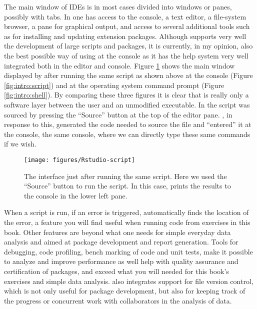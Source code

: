 \documentclass[krantz2]{krantz}\usepackage{knitr}
\begin{document}
The main window of IDEs is in most cases divided into windows or panes, possibly with tabs. In \RStudio one has access to the \Rpgrm console, a text editor, a file-system browser, a pane for graphical output, and access to several additional tools such as for installing and updating extension packages. Although \RStudio supports very well the development of large scripts and packages, it is currently, in my opinion, also the best possible way of using \Rpgrm at the console as it has the \Rpgrm help system very well integrated both in the editor and \Rlang console. Figure \ref{fig:intro:rstudio} shows the main window displayed by \RStudio after running the same script as shown above at the \Rpgrm console (Figure \ref{fig:intro:script}) and at the operating system command prompt (Figure \ref{fig:intro:shell}). By comparing these three figures it is clear that \RStudio is really only a software layer between the user and an unmodified \Rpgrm executable. In \RStudio the script was sourced by pressing the ``Source'' button at the top of the editor pane. \RStudio, in response to this, generated the code needed to source the file and ``entered'' it at the console, the same console, where we can directly type these same \Rpgrm commands if we wish.

\begin{figure}
  \centering
  \texttt{[image: figures/Rstudio-script]}
  \caption[Script in Rstudio]{The \RStudio interface just after running the same script. Here we used the ``Source'' button to run the script. In this case, \Rpgrm prints the results to the \Rpgrm console in the lower left pane.}\label{fig:intro:rstudio}
\end{figure}

\begin{explainbox}
When a script is run, if an error is triggered, \RStudio automatically finds the location of the error, a feature you will find useful when running code from exercises in this book. Other features are beyond what one needs for simple everyday data analysis and aimed at package development and report generation. Tools for debugging, code profiling, bench marking of code and unit tests, make it possible to analyze and improve performance as well help with quality assurance and certification of \Rlang packages, and exceed what you will needed for this book's exercises and simple data analysis. \RStudio also integrates support for file version control, which is not only useful for package development, but also for keeping track of the progress or concurrent work with collaborators in the analysis of data.
\end{explainbox}
\end{document}
